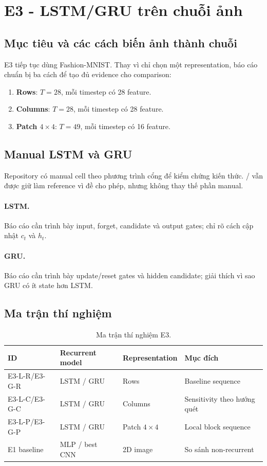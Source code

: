 \section{E3 - LSTM/GRU trên chuỗi ảnh}

\subsection{Mục tiêu và các cách biến ảnh thành chuỗi}
E3 tiếp tục dùng Fashion-MNIST. Thay vì chỉ chọn một representation, báo cáo chuẩn bị ba cách để tạo đủ evidence cho comparison:
\begin{enumerate}
\item \textbf{Rows}: $T=28$, mỗi timestep có 28 feature.
\item \textbf{Columns}: $T=28$, mỗi timestep có 28 feature.
\item \textbf{Patch $4\times4$}: $T=49$, mỗi timestep có 16 feature.
\end{enumerate}

\subsection{Manual LSTM và GRU}
Repository có manual cell theo phương trình cổng để kiểm chứng kiến thức. / vẫn được giữ làm reference vì đề cho phép, nhưng không thay thế phần manual.

\paragraph{LSTM.} Báo cáo cần trình bày input, forget, candidate và output gates; chỉ rõ cách cập nhật $c_t$ và $h_t$.
\paragraph{GRU.} Báo cáo cần trình bày update/reset gates và hidden candidate; giải thích vì sao GRU có ít state hơn LSTM.


\subsection{Ma trận thí nghiệm}
\begin{table}[H]\centering
\caption{Ma trận thí nghiệm E3.}
\begin{tabularx}{0.92\textwidth}{@{}lllX@{}}
\toprule
ID & Recurrent model & Representation & Mục đích \\
\midrule
E3-L-R/E3-G-R & LSTM / GRU & Rows & Baseline sequence \\
E3-L-C/E3-G-C & LSTM / GRU & Columns & Sensitivity theo hướng quét \\
E3-L-P/E3-G-P & LSTM / GRU & Patch $4\times4$ & Local block sequence \\
E1 baseline & MLP / best CNN & 2D image & So sánh non-recurrent \\
\bottomrule
\end{tabularx}
\end{table}

